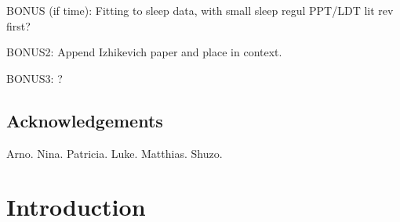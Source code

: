 \documentclass[mphil,deptreport,ai]{infthesis} %
\begin{document}
\begin{preliminary}
{BONUS (if time): Fitting to sleep data, with small sleep regul PPT/LDT lit rev first?

BONUS2: Append Izhikevich paper and place in context.

BONUS3: ?
}

\maketitle

\section*{Acknowledgements}
Arno.
Nina.
Patricia.
Luke.
Matthias.
Shuzo.

\tableofcontents
\end{preliminary}


\chapter{Introduction}




\end{document}
